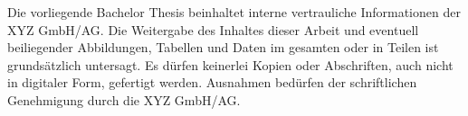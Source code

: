 Die vorliegende Bachelor Thesis beinhaltet interne vertrauliche Informationen der XYZ GmbH/AG. Die Weitergabe des Inhaltes dieser Arbeit und eventuell beiliegender Abbildungen, Tabellen und Daten im gesamten oder in Teilen ist grundsätzlich untersagt. Es dürfen keinerlei Kopien oder Abschriften, auch nicht in digitaler Form, gefertigt werden. Ausnahmen bedürfen der schriftlichen Genehmigung durch die XYZ GmbH/AG. 
\newpage